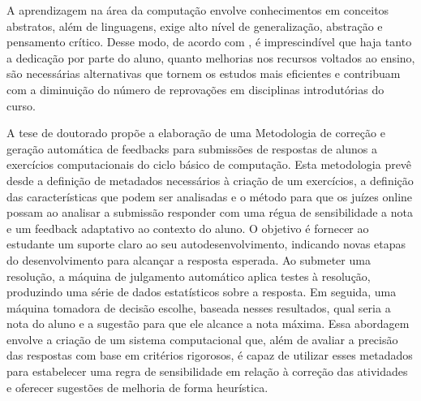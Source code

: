 
A aprendizagem na área da computação envolve conhecimentos em conceitos abstratos, além de linguagens, exige alto nível de generalização, abstração e pensamento crítico. Desse modo, de acordo com \cite{InteractingFactorsThatPredict}, é imprescindível que haja tanto a dedicação por parte do aluno, quanto melhorias nos recursos voltados ao ensino, são necessárias alternativas que tornem os estudos mais eficientes e contribuam com a diminuição do número de reprovações em disciplinas introdutórias do curso. 

A tese de doutorado propõe a elaboração de uma Metodologia de correção e geração automática de feedbacks para submissões de respostas de alunos a exercícios computacionais do ciclo básico de computação. Esta metodologia prevê desde a definição de metadados necessários à criação de um exercícios, a definição das características que podem ser analisadas e o método para que os juízes online possam ao analisar a submissão responder com uma régua de sensibilidade a nota e um feedback adaptativo ao contexto do aluno. O objetivo é fornecer ao estudante um suporte claro ao seu autodesenvolvimento, indicando novas etapas do desenvolvimento para alcançar a resposta esperada.
Ao submeter uma resolução, a máquina de julgamento automático aplica testes à resolução, produzindo uma série de dados estatísticos sobre a resposta. Em seguida, uma máquina tomadora de decisão escolhe, baseada nesses resultados, qual seria a nota do aluno e a sugestão para que ele alcance a nota máxima. Essa abordagem envolve a criação de um sistema computacional que, além de avaliar a precisão das respostas com base em critérios rigorosos, é capaz de utilizar esses metadados para estabelecer uma regra de sensibilidade em relação à correção das atividades e oferecer sugestões de melhoria de forma heurística.


